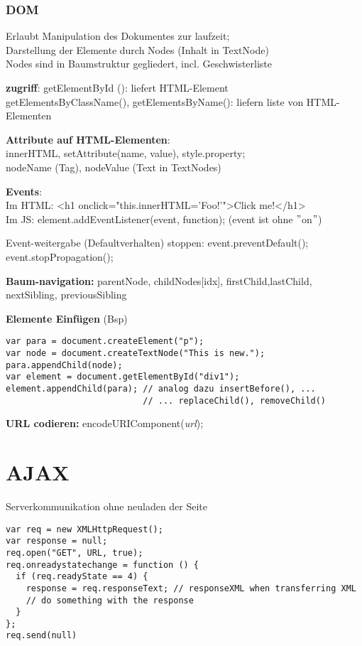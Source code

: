 \newpage

\subsubsection{DOM}
Erlaubt Manipulation des Dokumentes zur laufzeit;\\
Darstellung der Elemente durch Nodes (Inhalt in TextNode)\\
Nodes sind in Baumstruktur gegliedert, incl. Geschwisterliste

\textbf{zugriff}:
getElementById (): liefert HTML-Element\\
getElementsByClassName(), getElementsByName(): liefern liste von HTML-Elementen

\textbf{Attribute auf HTML-Elementen}:\\
innerHTML, setAttribute(name, value), style.property;\\
nodeName (Tag), nodeValue (Text in TextNodes)

\textbf{Events}: \\
Im HTML: <h1 onclick="this.innerHTML='Foo!'">Click me!</h1>\\
Im JS: element.addEventListener(event, function);    (event ist ohne  $"$on$"$)

Event-weitergabe (Defaultverhalten) stoppen:  
event.preventDefault(); event.stopPropagation();

\textbf{Baum-navigation: }
parentNode, childNodes[idx], firstChild,lastChild,
nextSibling, previousSibling

\textbf{Elemente Einfügen }(Bsp)
\begin{verbatim}
var para = document.createElement("p");
var node = document.createTextNode("This is new.");
para.appendChild(node);
var element = document.getElementById("div1");
element.appendChild(para); // analog dazu insertBefore(), ...
                           // ... replaceChild(), removeChild()
\end{verbatim}

\textbf{URL codieren:} encodeURIComponent(\textit{url});
\section{AJAX}
Serverkommunikation ohne neuladen der Seite
\begin{verbatim}
var req = new XMLHttpRequest();
var response = null;
req.open("GET", URL, true);
req.onreadystatechange = function () {
  if (req.readyState == 4) {
    response = req.responseText; // responseXML when transferring XML
    // do something with the response
  }
};
req.send(null)
\end{verbatim}

